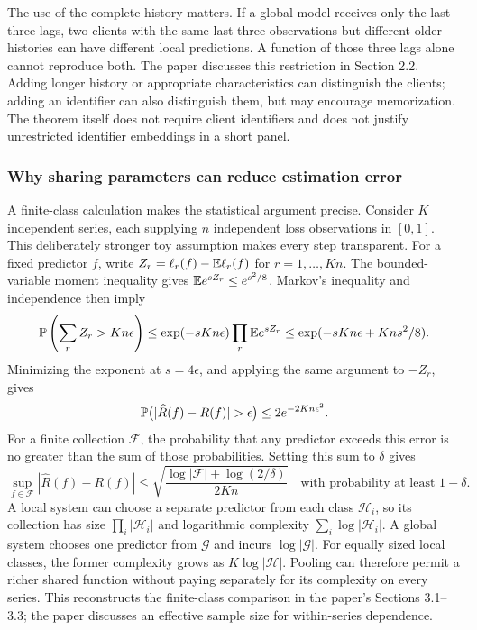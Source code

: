 The use of the complete history matters. If a global model receives only the last three lags, two clients with the same last three observations but different older histories can have different local predictions. A function of those three lags alone cannot reproduce both. The paper discusses this restriction in Section 2.2. Adding longer history or appropriate characteristics can distinguish the clients; adding an identifier can also distinguish them, but may encourage memorization. The theorem itself does not require client identifiers and does not justify unrestricted identifier embeddings in a short panel.

\subsubsection{Why sharing parameters can reduce estimation error}

A finite-class calculation makes the statistical argument precise. Consider $K$ independent series, each supplying $n$ independent loss observations in $[0,1]$. This deliberately stronger toy assumption makes every step transparent. For a fixed predictor $f$, write $Z_r=\ell_r(f)-\mathbb{E}\ell_r(f)$ for $r=1,\ldots,Kn$. The bounded-variable moment inequality gives $\mathbb{E} e^{sZ_r}\le e^{s^2/8}$. Markov's inequality and independence then imply
\[
 \mathbb{P}\left(\sum_r Z_r>Kn\epsilon\right)
 \le \exp(-sKn\epsilon)\prod_r\mathbb{E} e^{sZ_r}
 \le \exp(-sKn\epsilon+Kn s^2/8).
\]
Minimizing the exponent at $s=4\epsilon$, and applying the same argument to $-Z_r$, gives
\[
 \Prb\bigl(|\widehat R(f)-R(f)|>\epsilon\bigr)
 \le 2e^{-2Kn\epsilon^2}.
\]
For a finite collection $\mathcal F$, the probability that any predictor exceeds this error is no greater than the sum of those probabilities. Setting this sum to $\delta$ gives
\begin{equation}
 \sup_{f\in\mathcal F}|\widehat R(f)-R(f)|
 \le \sqrt{\frac{\log|\mathcal F|+\log(2/\delta)}{2Kn}}
 \quad\text{with probability at least }1-\delta.
 \label{eq:global-bound}
\end{equation}
A local system can choose a separate predictor from each class $\mathcal H_i$, so its collection has size $\prod_i|\mathcal H_i|$ and logarithmic complexity $\sum_i\log|\mathcal H_i|$. A global system chooses one predictor from $\mathcal G$ and incurs $\log|\mathcal G|$. For equally sized local classes, the former complexity grows as $K\log|\mathcal H|$. Pooling can therefore permit a richer shared function without paying separately for its complexity on every series. This reconstructs the finite-class comparison in the paper's Sections 3.1--3.3; the paper discusses an effective sample size for within-series dependence.

